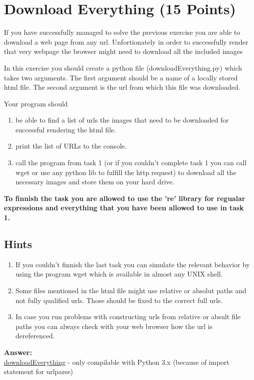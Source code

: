 \documentclass{WeSTassignment}
\begin{document}
\section{Download Everything (15 Points)}

If you have successfully managed to solve the previous exercise you are able to download a web page from any url. Unfortionately in order to successfully render that very webpage the browser might need to download all the included images

In this exercise you should create a python file (downloadEverything.py) which takes two arguments. The first argument should be a name of a locally stored html file. The second argument is the url from which this file was downloaded.

Your program should 
\begin{enumerate}
\item be able to find a list of urls the images that need to be downloaded for successful rendering the html file.
\item print the list of URLs to the console.
\item call the program from task 1 (or if you couldn't complete task 1 you can call wget or use any python lib to fulfill the http request) to download all the necessary images and store them on your hard drive.
\end{enumerate}

\textbf{To finnish the task you are allowed to use the 're' library for regualar expressions and everything that you have been allowed to use in task 1.}

\subsection{Hints}
\begin{enumerate}
\item If you couldn't finnish the last task you can simulate the relevant behavior by using the program wget which is available in almost any UNIX shell. 
\item Some files mentioned in the html file might use relative or absolut paths and not fully qualified urls. Those should be fixed to the correct full urls. 
\item In case you run problems with constructing urls from relative or absult file paths you can always check with your web browser how the url is dereferenced.
\end{enumerate}

\textbf{Answer:} \\
\underline{downloadEverything} - only compilable with Python 3.x (because of import statement for urlparse)\\










\makefooter
\end{document}
